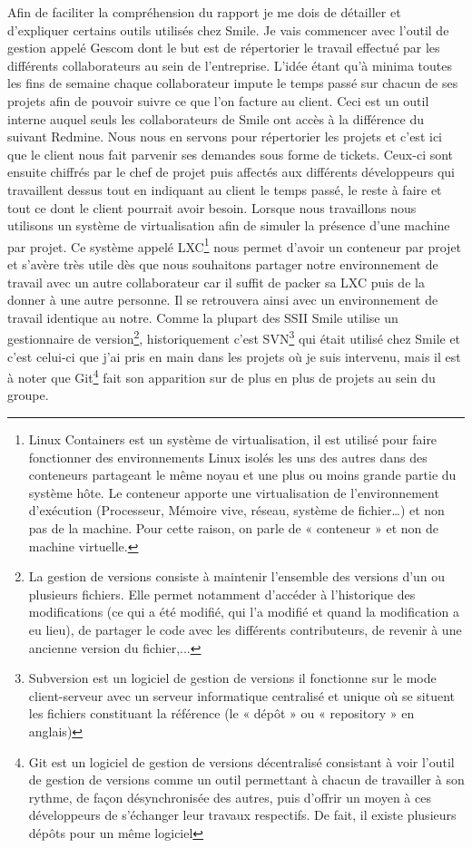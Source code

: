 \documentclass[a4paper,11pt,twoside]{report}
\begin{document}
  Afin de faciliter la compréhension du rapport je me dois de détailler et d'expliquer certains outils utilisés chez Smile. Je vais commencer avec l'outil de gestion appelé Gescom dont le but est de répertorier le travail effectué par les différents collaborateurs au sein de l'entreprise. L'idée étant qu'à minima toutes les fins de semaine chaque collaborateur impute le temps passé sur chacun de ses projets afin de pouvoir suivre ce que l'on facture au client. Ceci est un outil interne auquel seuls les collaborateurs de Smile ont accès à la différence du suivant Redmine. Nous nous en servons pour répertorier les projets et c'est ici que le client nous fait parvenir ses demandes sous forme de tickets. Ceux-ci sont ensuite chiffrés par le chef de projet puis affectés aux différents développeurs qui travaillent dessus tout en indiquant au client le temps passé, le reste à faire et tout ce dont le client pourrait avoir besoin. Lorsque nous travaillons nous utilisons un système de virtualisation afin de simuler la présence d'une machine par projet. Ce système appelé LXC\footnote{Linux Containers est un système de virtualisation, il est utilisé pour faire fonctionner des environnements Linux isolés les uns des autres dans des conteneurs partageant le même noyau et une plus ou moins grande partie du système hôte. Le conteneur apporte une virtualisation de l'environnement d'exécution (Processeur, Mémoire vive, réseau, système de fichier…) et non pas de la machine. Pour cette raison, on parle de « conteneur » et non de machine virtuelle.} nous permet d'avoir un conteneur par projet et s'avère très utile dès que nous souhaitons partager notre environnement de travail avec un autre collaborateur car il suffit de packer sa LXC puis de la donner à une autre personne. Il se retrouvera ainsi avec un environnement de travail identique au notre. Comme la plupart des SSII Smile utilise un gestionnaire de version\footnote{La gestion de versions consiste à maintenir l'ensemble des versions d'un ou plusieurs fichiers. Elle permet notamment d'accéder à l'historique des modifications (ce qui a été modifié, qui l'a modifié et quand la modification a eu lieu), de partager le code avec les différents contributeurs, de revenir à une ancienne version du fichier,...}, historiquement c'est SVN\footnote{Subversion est un logiciel de gestion de versions il fonctionne sur le mode client-serveur avec un serveur informatique centralisé et unique où se situent les fichiers constituant la référence (le « dépôt » ou « repository » en anglais)} qui était utilisé chez Smile et c'est celui-ci que j'ai pris en main dans les projets où je suis intervenu, mais il est à noter que Git\footnote{Git est un logiciel de gestion de versions décentralisé consistant à voir l'outil de gestion de versions comme un outil permettant à chacun de travailler à son rythme, de façon désynchronisée des autres, puis d'offrir un moyen à ces développeurs de s'échanger leur travaux respectifs. De fait, il existe plusieurs dépôts pour un même logiciel} fait son apparition sur de plus en plus de projets au sein du groupe.
  
\end{document}
